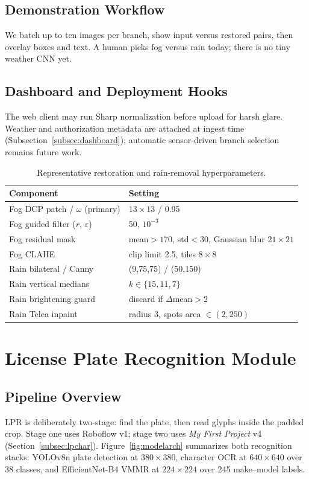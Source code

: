 \documentclass[10pt, conference]{IEEEtran}
\begin{document}
\subsection{Demonstration Workflow}
We batch up to ten images per branch, show input versus restored pairs, then overlay boxes and text. A human picks fog versus rain today; there is no tiny weather CNN yet.

\subsection{Dashboard and Deployment Hooks}
The web client may run Sharp normalization before upload for harsh glare. Weather and authorization metadata are attached at ingest time (Subsection~\ref{subsec:dashboard}); automatic sensor-driven branch selection remains future work.

\begin{table}[!htbp]
\centering
\caption{Representative restoration and rain-removal hyperparameters.}
\label{tab:preparams}
\begin{tabular}{@{}ll@{}}
\toprule
Component & Setting \\
\midrule
Fog DCP patch / $\omega$ (primary) & $13\times13$ / 0.95 \\
Fog guided filter ($r$, $\varepsilon$) & 50, $10^{-3}$ \\
Fog residual mask & mean${>}170$, std${<}30$, Gaussian blur $21\times21$ \\
Fog CLAHE & clip limit 2.5, tiles $8\times8$ \\
Rain bilateral / Canny & (9,75,75) / (50,150) \\
Rain vertical medians & $k\in\{15,11,7\}$ \\
Rain brightening guard & discard if $\Delta$mean${>}2$ \\
Rain Telea inpaint & radius 3, spots area $\in(2,250)$ \\
\bottomrule
\end{tabular}
\end{table}

\section{License Plate Recognition Module}
\label{sec:lpr}
\subsection{Pipeline Overview}
LPR is deliberately two-stage: find the plate, then read glyphs inside the padded crop. Stage one uses Roboflow v1; stage two uses \emph{My First Project} v4 (Section~\ref{subsec:lpchar}). Figure~\ref{fig:modelarch} summarizes both recognition stacks: YOLOv8n plate detection at $380\times380$, character OCR at $640\times640$ over 38 classes, and EfficientNet-B4 VMMR at $224\times224$ over 245 make--model labels.
\end{document}
